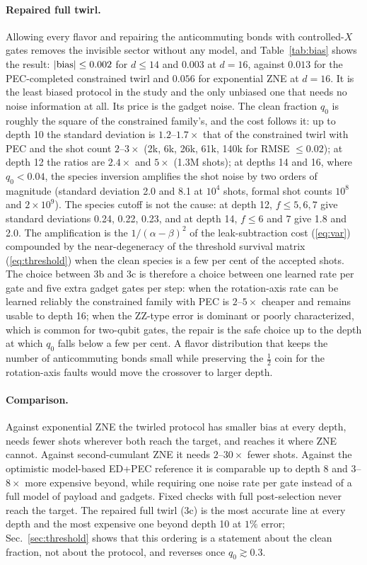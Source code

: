 \documentclass[11pt,a4paper]{article}
\theoremstyle{remark}
\begin{document}
\paragraph{Repaired full twirl.} Allowing every flavor and repairing the anticommuting bonds with controlled-$X$ gates removes the invisible sector without any model, and Table~\ref{tab:bias} shows the result: $|{\rm bias}|\le0.002$ for $d\le14$ and $0.003$ at $d=16$, against $0.013$ for the PEC-completed constrained twirl and $0.056$ for exponential ZNE at $d=16$. It is the least biased protocol in the study and the only unbiased one that needs no noise information at all. Its price is the gadget noise. The clean fraction $q_0$ is roughly the square of the constrained family's, and the cost follows it: up to depth 10 the standard deviation is $1.2$--$1.7\times$ that of the constrained twirl with PEC and the shot count $2$--$3\times$ (2k, 6k, 26k, 61k, 140k for RMSE $\le0.02$); at depth 12 the ratios are $2.4\times$ and $5\times$ (1.3M shots); at depths 14 and 16, where $q_0<0.04$, the species inversion amplifies the shot noise by two orders of magnitude (standard deviation 2.0 and 8.1 at $10^4$ shots, formal shot counts $10^8$ and $2\times10^9$). The species cutoff is not the cause: at depth 12, $f\le5,6,7$ give standard deviations 0.24, 0.22, 0.23, and at depth 14, $f\le6$ and $7$ give 1.8 and 2.0. The amplification is the $1/(\alpha-\beta)^2$ of the leak-subtraction cost (\ref{eq:var}) compounded by the near-degeneracy of the threshold survival matrix (\ref{eq:threshold}) when the clean species is a few per cent of the accepted shots. The choice between 3b and 3c is therefore a choice between one learned rate per gate and five extra gadget gates per step: when the rotation-axis rate can be learned reliably the constrained family with PEC is $2$--$5\times$ cheaper and remains usable to depth 16; when the ZZ-type error is dominant or poorly characterized, which is common for two-qubit gates, the repair is the safe choice up to the depth at which $q_0$ falls below a few per cent. A flavor distribution that keeps the number of anticommuting bonds small while preserving the $\tfrac12$ coin for the rotation-axis faults would move the crossover to larger depth.

\paragraph{Comparison.} Against exponential ZNE the twirled protocol has smaller bias at every depth, needs fewer shots wherever both reach the target, and reaches it where ZNE cannot. Against second-cumulant ZNE it needs $2$--$30\times$ fewer shots. Against the optimistic model-based ED+PEC reference it is comparable up to depth 8 and $3$--$8\times$ more expensive beyond, while requiring one noise rate per gate instead of a full model of payload and gadgets. Fixed checks with full post-selection never reach the target. The repaired full twirl (3c) is the most accurate line at every depth and the most expensive one beyond depth 10 at $1\%$ error; Sec.~\ref{sec:threshold} shows that this ordering is a statement about the clean fraction, not about the protocol, and reverses once $q_0\gtrsim0.3$.
\end{document}
